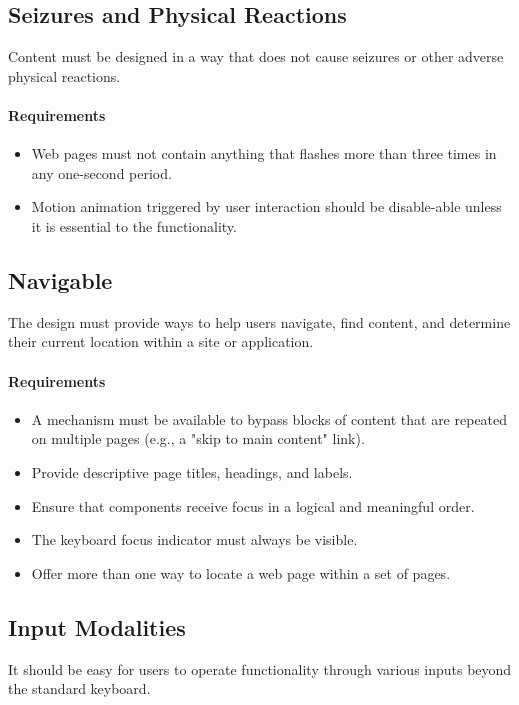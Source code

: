 \documentclass{scrbook}
\begin{document}
\subsection{Seizures and Physical Reactions}
Content must be designed in a way that does not cause seizures or other adverse physical reactions.

\paragraph{Requirements}
\begin{itemize}
    \item Web pages must not contain anything that flashes more than three times in any one-second period.
    \item Motion animation triggered by user interaction should be disable-able unless it is essential to the functionality.
\end{itemize}

\subsection{Navigable}
The design must provide ways to help users navigate, find content, and determine their current location within a site or application.

\paragraph{Requirements}
\begin{itemize}
    \item A mechanism must be available to bypass blocks of content that are repeated on multiple pages (e.g., a "skip to main content" link).
    \item Provide descriptive page titles, headings, and labels.
    \item Ensure that components receive focus in a logical and meaningful order.
    \item The keyboard focus indicator must always be visible.
    \item Offer more than one way to locate a web page within a set of pages.
\end{itemize}

\subsection{Input Modalities}
It should be easy for users to operate functionality through various inputs beyond the standard keyboard.
\end{document}
